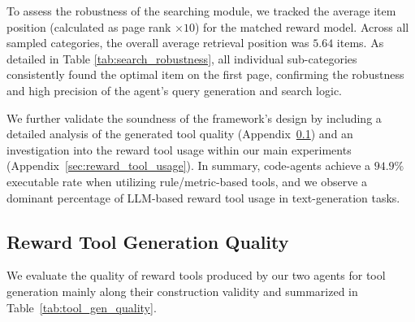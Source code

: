 To assess the robustness of the searching module, we tracked the average item position (calculated as page rank $\times 10$) for the matched reward model. Across all sampled categories, the overall average retrieval position was $5.64$ items. As detailed in Table \ref{tab:search_robustness}, all individual sub-categories consistently found the optimal item on the first page, confirming the robustness and high precision of the agent's query generation and search logic.

We further validate the soundness of the framework's design by including a detailed analysis of the generated tool quality (Appendix~\ref{sec:gen_tool_quality}) and an investigation into the reward tool usage within our main experiments (Appendix~\ref{sec:reward_tool_usage}). In summary, code-agents achieve a $94.9\%$ executable rate when utilizing rule/metric-based tools, and we observe a dominant percentage of LLM-based reward tool usage in text-generation tasks.



\subsection{Reward Tool Generation Quality} \label{sec:gen_tool_quality}






We evaluate the quality of reward tools produced by our two agents for tool generation mainly along their construction validity and summarized in Table~\ref{tab:tool_gen_quality}.




